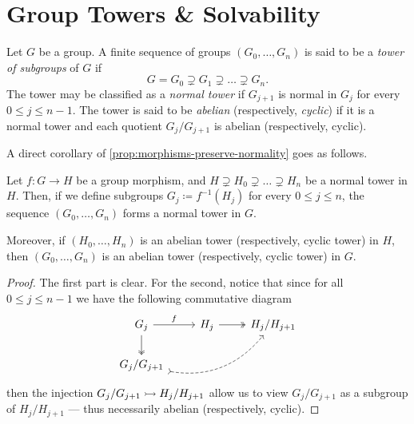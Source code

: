 \section{Group Towers \& Solvability}


\begin{definition}
    \label{def:tower-subgroups}
    Let \(G\) be a group. A finite sequence of groups \((G_0, \dots, G_n)\) is said
    to be a \emph{tower of subgroups} of \(G\) if
    \[
        G = G_0 \supsetneq G_1 \supsetneq \dots \supsetneq G_n.
    \]
    The tower may be classified as a \emph{normal tower} if \(G_{j + 1}\) is normal
    in \(G_j\) for every \(0 \leq j \leq n - 1\). The tower is said to be
    \emph{abelian} (respectively, \emph{cyclic}) if it is a normal tower and each
    quotient \(G_j/G_{j+1}\) is abelian (respectively, cyclic).
\end{definition}

A direct corollary of \cref{prop:morphisms-preserve-normality} goes as follows.

\begin{corollary}
    \label{cor:morphism-normal-towers}
    Let \(f: G \to H\) be a group morphism, and \(H \supsetneq H_0 \supsetneq \dots
    \supsetneq H_n\) be a normal tower in \(H\). Then, if we define subgroups \(G_j
    \coloneq f^{-1}(H_j)\) for every \(0 \leq j \leq n\), the sequence \((G_0,
    \dots, G_n)\) forms a normal tower in \(G\).

    Moreover, if \((H_0, \dots, H_n)\) is an abelian tower (respectively, cyclic
    tower) in \(H\), then \((G_0, \dots, G_n)\) is an abelian tower (respectively,
    cyclic tower) in \(G\).
\end{corollary}

\begin{proof}
    The first part is clear. For the second, notice that since for all \(0 \leq j
    \leq n-1\) we have the following commutative diagram
    \[
        \begin{tikzcd}
            G_j \ar[d, two heads] \ar[r, "f"] &H_j \ar[r, two heads] & H_j/H_{j+1} \\
            G_j/G_{j+1} \ar[rru, bend right, tail, dashed]
        \end{tikzcd}
    \]
    then the injection \(G_j/G_{j+1} \rightarrowtail H_j/H_{j+1}\) allow us to view
    \(G_j/G_{j+1}\) as a subgroup of \(H_j/H_{j+1}\) --- thus necessarily abelian
    (respectively, cyclic).
\end{proof}

